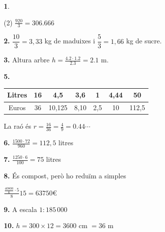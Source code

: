 \documentclass[a4paper, pdf, twoside]{book}
\begin{document}
\begin{multicols}{2}
\begin{enumerate}
 \item[\fontfamily{phv}\selectfont\color{blue}\textbf{1}. ] 
 \begin{tasks}[column-sep=1em, item-indent=1.3333em](2)
	 \task $\frac {920}{3}=306.666$
\end{tasks}
 \end{enumerate}
\begin{enumerate}
\vspace{0.25cm}
\item[\fontfamily{phv}\selectfont\color{blue}\textbf{2. }] 
$\dfrac {10}{3} = 3,33$ kg de maduixes i $\dfrac {5}{3} = 1,66$ kg de sucre.
\vspace{0.25cm}
\item[\fontfamily{phv}\selectfont\color{blue}\textbf{3. }] 
Altura arbre $h=\frac {4.2 \cdot 1.2}{2.3}=2.1$ m.
\vspace{0.25cm}
\item[\fontfamily{phv}\selectfont\color{blue}\textbf{5. }] 
 \begin {tabular}{|c|c|c|c|c|c|c|} \hline Litres & 16 & 4,5 & 3,6& 1 & 4,44 & 50\tabularnewline \hline Euros & 36 &10,125 & 8,10 &2,5 & 10 & 112,5\tabularnewline \hline \end {tabular} \par La raó és $r=\frac {16}{36}=\frac {4}{9}=0.44\cdots $ 
\vspace{0.25cm}
\item[\fontfamily{phv}\selectfont\color{blue}\textbf{6. }] 
$\frac {1500\cdot 72}{960}=112,5$ litres
\vspace{0.25cm}
\item[\fontfamily{phv}\selectfont\color{blue}\textbf{7. }] 
$\frac {1250\cdot 6}{100}=75$ litres
\vspace{0.25cm}
\item[\fontfamily{phv}\selectfont\color{blue}\textbf{8. }] 
És compost, però ho reduïm a simples\par $\frac {\frac {40800}{6} \cdot 5}{8} 15 = 63750 \euro{}$
\vspace{0.25cm}
\item[\fontfamily{phv}\selectfont\color{blue}\textbf{9. }] 
A escala $1:185\,000$
\vspace{0.25cm}
\item[\fontfamily{phv}\selectfont\color{blue}\textbf{10. }] 
$h =300\times 12=3600$ cm $= 36$ m
 \end{enumerate}
\vspace{0.3cm}



\end{multicols}
\end{document}
